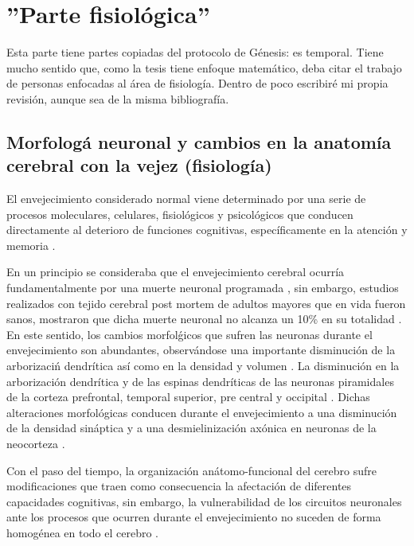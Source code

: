 \chapter{''Parte fisiol\'ogica''}

Esta parte tiene partes copiadas del protocolo de G\'enesis: es temporal. Tiene mucho sentido
que, como la tesis tiene enfoque matem\'atico, deba citar el trabajo de personas enfocadas al
\'area de fisiolog\'ia. Dentro de poco escribir\'e mi propia revisi\'on, aunque sea de la misma
bibliograf\'ia.

\section{Morfolog\'a neuronal y cambios en la anatomía cerebral con la vejez (fisiolog\'ia)}

El envejecimiento considerado normal viene determinado por una serie de procesos moleculares, 
celulares, fisiol\'ogicos y psicol\'ogicos que conducen directamente al deterioro de funciones 
cognitivas, específicamente en la atenci\'on y memoria \cite{Navarrete03,Park09}.

En un principio se consideraba que el envejecimiento cerebral ocurr\'ia fundamentalmente por una 
muerte neuronal programada \cite{Coleman87}, sin embargo, estudios realizados con tejido cerebral 
post mortem de adultos mayores que en vida fueron sanos, mostraron que dicha muerte neuronal no 
alcanza un 10\% en su totalidad \cite{Esiri07}. En este sentido, los cambios morfol\'gicos que 
sufren las neuronas durante el envejecimiento son abundantes, observ\'andose una importante 
disminuci\'on de la arborizaci\'n dendr\'itica as\'i como en la densidad y volumen \cite{Hita14}. 
La disminución en la arborización dendr\'itica y de las espinas dendr\'iticas de las neuronas 
piramidales de la corteza prefrontal, temporal superior, pre central y occipital \cite{Hita14}. 
Dichas alteraciones morfol\'ogicas conducen durante el envejecimiento a una disminuci\'on de 
la densidad sin\'aptica y a una desmielinizaci\'on ax\'onica en neuronas de la 
neocorteza \cite{Terry}.

Con el paso del tiempo, la organizaci\'on an\'atomo-funcional del cerebro sufre modificaciones 
que traen como consecuencia la afectaci\'on de diferentes capacidades cognitivas, sin embargo, 
la vulnerabilidad de los circuitos neuronales ante los procesos que ocurren durante el 
envejecimiento no suceden de forma homogénea en todo el cerebro \cite{Hita14}.

